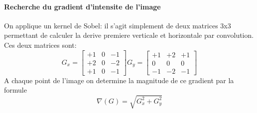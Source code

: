 \documentclass[a4paper, 12pt, titlepage, oneside]{article}
\begin{document}
		\paragraph{\textbf{Recherche du gradient d'intensite de l'image}}
				On applique un kernel de Sobel: il s'agit simplement de deux matrices 3x3 permettant de calculer la derive premiere verticale et horizontale par convolution. Ces deux matrices sont:
				\\ \[G_x = \begin{bmatrix}  +1  & 0 & -1 \\ +2 & 0 & -2  \\ +1 &  0 & -1\end{bmatrix} 
					G_y = \begin{bmatrix} +1 & +2 & +1  \\  0 & 0 &  0  \\ -1 & -2 & -1\end{bmatrix}\]
						A chaque point de l'image on determine la magnitude de ce gradient par la formule
					\[\nabla(G) = \sqrt{G_x^2 + G_y^2}\]
\end{document}
